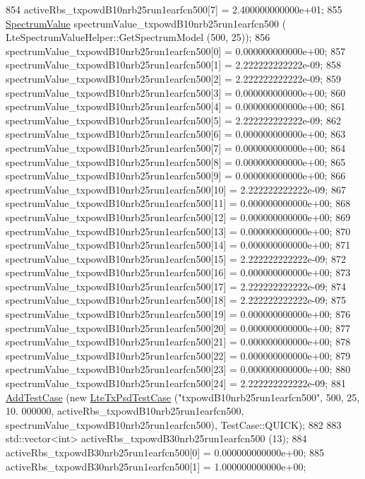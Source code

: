 \begin{DoxyCode}
854   activeRbs\_txpowdB10nrb25run1earfcn500[7] = 2.400000000000e+01;
855   \hyperlink{classns3_1_1SpectrumValue}{SpectrumValue} spectrumValue\_txpowdB10nrb25run1earfcn500 (
      LteSpectrumValueHelper::GetSpectrumModel (500, 25));
856   spectrumValue\_txpowdB10nrb25run1earfcn500[0] = 0.000000000000e+00;
857   spectrumValue\_txpowdB10nrb25run1earfcn500[1] = 2.222222222222e-09;
858   spectrumValue\_txpowdB10nrb25run1earfcn500[2] = 2.222222222222e-09;
859   spectrumValue\_txpowdB10nrb25run1earfcn500[3] = 0.000000000000e+00;
860   spectrumValue\_txpowdB10nrb25run1earfcn500[4] = 0.000000000000e+00;
861   spectrumValue\_txpowdB10nrb25run1earfcn500[5] = 2.222222222222e-09;
862   spectrumValue\_txpowdB10nrb25run1earfcn500[6] = 0.000000000000e+00;
863   spectrumValue\_txpowdB10nrb25run1earfcn500[7] = 0.000000000000e+00;
864   spectrumValue\_txpowdB10nrb25run1earfcn500[8] = 0.000000000000e+00;
865   spectrumValue\_txpowdB10nrb25run1earfcn500[9] = 0.000000000000e+00;
866   spectrumValue\_txpowdB10nrb25run1earfcn500[10] = 2.222222222222e-09;
867   spectrumValue\_txpowdB10nrb25run1earfcn500[11] = 0.000000000000e+00;
868   spectrumValue\_txpowdB10nrb25run1earfcn500[12] = 0.000000000000e+00;
869   spectrumValue\_txpowdB10nrb25run1earfcn500[13] = 0.000000000000e+00;
870   spectrumValue\_txpowdB10nrb25run1earfcn500[14] = 0.000000000000e+00;
871   spectrumValue\_txpowdB10nrb25run1earfcn500[15] = 2.222222222222e-09;
872   spectrumValue\_txpowdB10nrb25run1earfcn500[16] = 0.000000000000e+00;
873   spectrumValue\_txpowdB10nrb25run1earfcn500[17] = 2.222222222222e-09;
874   spectrumValue\_txpowdB10nrb25run1earfcn500[18] = 2.222222222222e-09;
875   spectrumValue\_txpowdB10nrb25run1earfcn500[19] = 0.000000000000e+00;
876   spectrumValue\_txpowdB10nrb25run1earfcn500[20] = 0.000000000000e+00;
877   spectrumValue\_txpowdB10nrb25run1earfcn500[21] = 0.000000000000e+00;
878   spectrumValue\_txpowdB10nrb25run1earfcn500[22] = 0.000000000000e+00;
879   spectrumValue\_txpowdB10nrb25run1earfcn500[23] = 0.000000000000e+00;
880   spectrumValue\_txpowdB10nrb25run1earfcn500[24] = 2.222222222222e-09;
881   \hyperlink{classns3_1_1TestCase_a3718088e3eefd5d6454569d2e0ddd835}{AddTestCase} (\textcolor{keyword}{new} \hyperlink{classLteTxPsdTestCase}{LteTxPsdTestCase} (\textcolor{stringliteral}{"txpowdB10nrb25run1earfcn500"}, 500, 25, 10.
      000000, activeRbs\_txpowdB10nrb25run1earfcn500, spectrumValue\_txpowdB10nrb25run1earfcn500), TestCase::QUICK);
882 
883   std::vector<int> activeRbs\_txpowdB30nrb25run1earfcn500 (13);
884   activeRbs\_txpowdB30nrb25run1earfcn500[0] = 0.000000000000e+00;
885   activeRbs\_txpowdB30nrb25run1earfcn500[1] = 1.000000000000e+00;

\end{DoxyCode}
